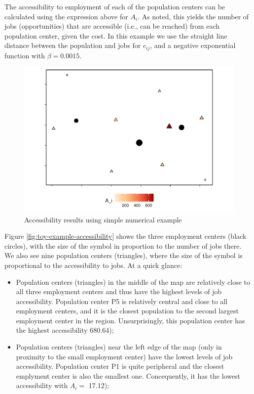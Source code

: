 \documentclass[]{elsarticle} %
\begin{document}
The accessibility to employment of each of the population centers can be
calculated using the expression above for \(A_i\). As noted, this yields
the number of jobs (opportunities) that are accessible (i.e., can be
reached) from each population center, given the cost. In this example we
use the straight line distance between the population and jobs for
\(c_{ij}\), and a negative exponential function with \(\beta = 0.0015\).

\begin{figure}
\includegraphics[width=1\linewidth]{Spatial-Availability_files/figure-latex/toy-example-accessibility-plot-1} \caption{\label{fig:toy-example-accessibility}Accessibility results using simple numerical example}\label{fig:toy-example-accessibility-plot}
\end{figure}

Figure \ref{fig:toy-example-accessibility} shows the three employment
centers (black circles), with the size of the symbol in proportion to
the number of jobs there. We also see nine population centers
(triangles), where the size of the symbol is proportional to the
accessibility to jobs. At a quick glance:

\begin{itemize}
\item
  Population centers (triangles) in the middle of the map are relatively
  close to all three employment centers and thus have the highest levels
  of job accessibility. Population center P5 is relatively central and
  close to all employment centers, and it is the closest population to
  the second largest employment center in the region. Unsurprisingly,
  this population center has the highest accessibility 680.64);
\item
  Population centers (triangles) near the left edge of the map (only in
  proximity to the small employment center) have the lowest levels of
  job accessibility. Population center P1 is quite peripheral and the
  closest emplyment center is also the smallest one. Concequently, it
  has the lowest accessibility with \(A_i=\) 17.12);
\end{itemize}
\end{document}

